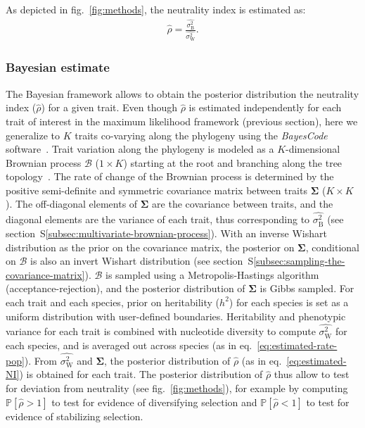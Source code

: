 \documentclass{article}
\newcommand{\UniDimArray}[1]{\bm{#1}}
\newcommand{\BiDimArray}[1]{\bm{#1}}
\newcommand{\proba}{\mathbb{P}}
\newcommand{\Heritability}{h^2}
\newcommand{\RateBetween}{\sigma^2_{\mathrm{B}}}
\newcommand{\RateWhithin}{\sigma^2_{\mathrm{W}}}
\newcommand{\EstRateBetween}{\widehat{\RateBetween}}
\newcommand{\EstRateWhithin}{\widehat{\RateWhithin}}
\newcommand{\EstNI}{\widehat{\rho}}
\newcommand{\Ntrait}{K}
\newcommand{\Covariancematrix}{\Sigma}
\newcommand{\CovarianceMatrix}{\BiDimArray{\Covariancematrix}}
\newcommand{\brownian}{\mathcal{B}}
\newcommand{\Brownian}{\UniDimArray{\brownian}}
\begin{document}
As depicted in fig.~\ref{fig:methods}, the neutrality index is estimated as:
\begin{gather}
    \EstNI = \frac{\EstRateBetween}{\EstRateWhithin}. \label{eq:estimated-NI}
\end{gather}

\subsubsection*{Bayesian estimate}

The Bayesian framework allows to obtain the posterior distribution the neutrality index ($\EstNI$) for a given trait.
Even though $\EstNI$ is estimated independently for each trait of interest in the maximum likelihood framework (previous section), here we generalize to $\Ntrait$ traits co-varying along the phylogeny using the \textit{BayesCode} software~\parencite{latrille_inferring_2021}.
Trait variation along the phylogeny is modeled as a $\Ntrait$-dimensional Brownian process $\Brownian$ ($1 \times \Ntrait$) starting at the root and branching along the tree topology~\parencite{huelsenbeck_detecting_2003, lartillot_phylogenetic_2011, lartillot_joint_2012, latrille_inferring_2021}.
The rate of change of the Brownian process is determined by the positive semi-definite and symmetric covariance matrix between traits $\CovarianceMatrix$ ($\Ntrait \times \Ntrait$).
The off-diagonal elements of $\CovarianceMatrix$ are the covariance between traits, and the diagonal elements are the variance of each trait, thus corresponding to $\EstRateBetween$ (see section~S\ref{subsec:multivariate-brownian-process}).
With an inverse Wishart distribution as the {prior} on the covariance matrix, the {posterior} on $\CovarianceMatrix$, conditional on $\brownian$ is also an invert Wishart distribution (see section~S\ref{subsec:sampling-the-covariance-matrix}).
$\Brownian$ is sampled using a Metropolis-Hastings algorithm (acceptance-rejection), and the posterior distribution of $\CovarianceMatrix$ is Gibbs sampled.
For each trait and each species, prior on heritability ($\Heritability$) for each species is set as a uniform distribution with user-defined boundaries.
Heritability and phenotypic variance for each trait is combined with nucleotide diversity to compute $\EstRateWhithin$ for each species, and is averaged out across species (as in eq.~\ref{eq:estimated-rate-pop}).
From $\EstRateWhithin$ and $\CovarianceMatrix$, the posterior distribution of $\EstNI$ (as in eq.~\ref{eq:estimated-NI}) is obtained for each trait.
The posterior distribution of $\EstNI$ thus allow to test for deviation from neutrality (see fig.~\ref{fig:methods}), for example by computing $\proba [\EstNI > 1 ]$ to test for evidence of diversifying selection and $\proba [\EstNI < 1 ]$ to test for evidence of stabilizing selection.
\end{document}
